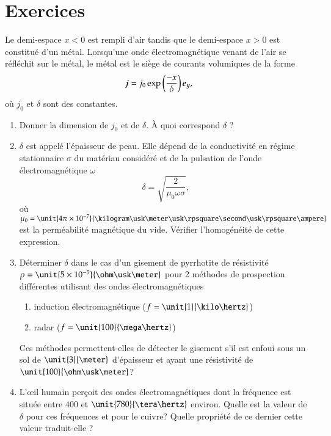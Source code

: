 \section{Exercices}
\begin{exocor}
	Le demi-espace $x < 0$ est rempli d'air tandis que le demi-espace
	$x > 0$ est constitué d'un métal. Lorsqu'une onde électromagnétique 
	venant de l'air se réfléchit sur le métal, le métal est le siège de courants
	volumiques de la forme 
	\begin{equation*}
	\vecj = j_0 \exp\left(\dfrac{-x}{\delta}\right)\ey,
	\end{equation*}
	où $j_0$ et $\delta$ sont des constantes.
	\begin{enumerate}
		\item Donner la dimension de $j_0$ et de $\delta$. À quoi correspond
		  $\delta$ ?
		\item $\delta$ est appelé l'épaisseur de peau. Elle dépend de
		  la conductivité en régime stationnaire $\sigma$ du matériau considéré
		  et de la pulsation de l'onde électromagnétique $\omega$
		  \begin{equation*}
			  \delta = \sqrt{\dfrac{2}{\mu_0 \omega \sigma}},
		  \end{equation*}
		  où $\mu_0 = \unit{4 \pi \times 10^{-7}}{\kilogram \usk \meter
		  \usk \rpsquare \second \usk \rpsquare \ampere}$ 
		  est la perméabilité magnétique du vide.
		  Vérifier l'homogénéité de cette expression.
		\item Déterminer $\delta$ dans le cas d'un gisement de pyrrhotite
		  de résistivité $\rho = \unit{5 \times 10^{-5}}{\ohm \usk
		  \meter}$ pour 2 méthodes de prospection différentes utilisant des
		  ondes électromagnétiques
		  \begin{enumerate}
			  \item induction électromagnétique ($f = \unit{1}{\kilo \hertz}$)
			  \item radar ($f = \unit{100}{\mega \hertz}$)
		 \end{enumerate}
		 Ces méthodes permettent-elles de détecter le gisement s'il est enfoui
		 sous un sol de $\unit{3}{\meter}$ d'épaisseur et ayant une résistivité de 
		 $\unit{100}{\ohm \usk \meter}$?
	 	\item L'\oe{}il humain perçoit des ondes électromagnétiques dont la
		  fréquence est située entre $400$ et $\unit{780}{\tera \hertz}$ 
		  environ. Quelle est la valeur de $\delta$ pour ces fréquences et pour
		  le cuivre? Quelle propriété de ce dernier cette valeur traduit-elle ?
	\end{enumerate}
\end{exocor}
\newpage

